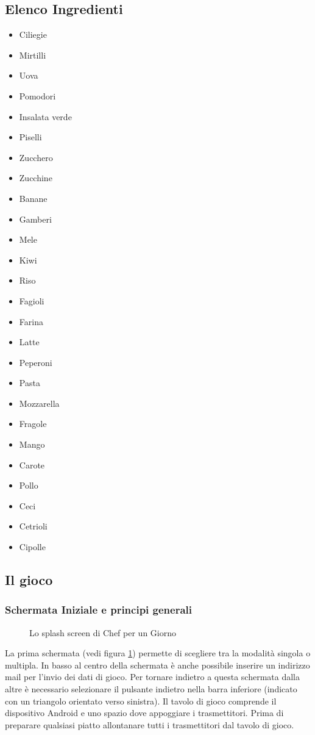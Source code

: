 \subsection{Elenco Ingredienti}
\begin{itemize}
\item Ciliegie
\item Mirtilli
\item Uova
\item Pomodori
\item Insalata verde
\item Piselli
\item Zucchero
\item Zucchine
\item Banane
\item Gamberi
\item Mele
\item Kiwi
\item Riso
\item Fagioli
\item Farina
\item Latte
\item Peperoni
\item Pasta
\item Mozzarella
\item Fragole
\item Mango
\item Carote
\item Pollo
\item Ceci
\item Cetrioli
\item Cipolle
\end{itemize}

\subsection{Il gioco}
\subsubsection{Schermata Iniziale e principi generali}

\begin{figure}[h!]
\caption{Lo splash screen di Chef per un Giorno}
\label{fig:splash}
\end{figure}

La prima schermata (vedi figura \ref{fig:splash}) permette di scegliere tra la modalità singola o multipla. In basso al centro della schermata è anche possibile inserire un indirizzo mail per l’invio dei dati di gioco. Per tornare indietro a questa schermata dalla altre è necessario selezionare il pulsante indietro nella barra inferiore (indicato con un triangolo orientato verso sinistra). 
Il tavolo di gioco comprende il dispositivo Android e uno spazio dove appoggiare i trasmettitori.
Prima di preparare qualsiasi piatto allontanare tutti i trasmettitori dal tavolo di gioco.

